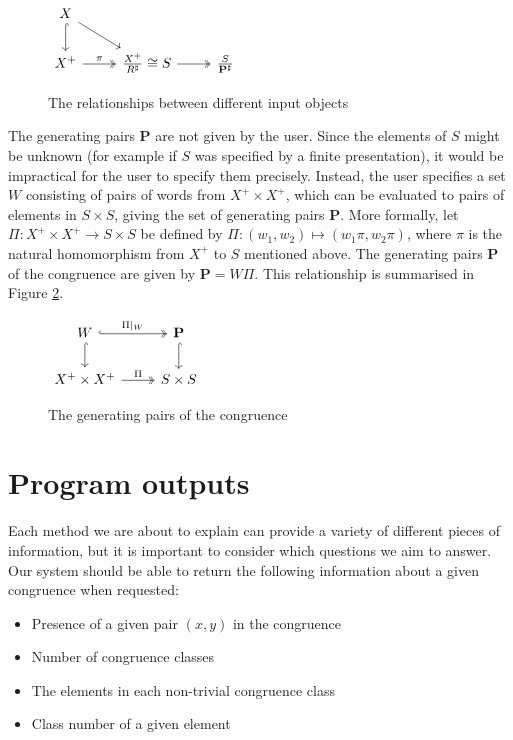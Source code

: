 \begin{figure}[h]
  \centering
  $\begin{tikzcd}
    X \arrow[dr] \arrow[d, hook] & \\
    X^+ \arrow[r, two heads, "\pi"] & \frac{X^+}{R^\sharp} \cong S \arrow[r, two heads] & \frac{S}{\mathbf{P}^\sharp}
  \end{tikzcd}$
  \caption{The relationships between different input objects}
  \label{fig:pairs-cd-1}
\end{figure}

The generating pairs $\mathbf{P}$ are not given by the user.  Since the elements
of $S$ might be unknown (for example if $S$ was specified by a finite
presentation), it would be impractical for the user to specify them precisely.
Instead, the user specifies a set $W$ consisting of pairs of words from
$X^+ \times X^+$, which can be evaluated to pairs of elements in $S \times S$,
giving the set of generating pairs $\mathbf{P}$.
More formally, let
$\Pi: X^+ \times X^+ \to S \times S$ be defined by
$\Pi: (w_1, w_2) \mapsto (w_1\pi, w_2\pi)$, where $\pi$ is the natural
homomorphism from $X^+$ to $S$ mentioned above.  The generating pairs
$\mathbf{P}$ of the congruence are given by $\mathbf{P} = W \Pi$.
This relationship is summarised in Figure \ref{fig:pairs-cd-2}.

\begin{figure}[h]
  \centering
  $\begin{tikzcd}
    W \arrow[r, hook, two heads, "\Pi|_W"] \arrow[d, hook] & \mathbf{P} \arrow[d, hook] \\
    X^+ \times X^+ \arrow[r, two heads, "\Pi"] & S \times S
  \end{tikzcd}$
  \caption{The generating pairs of the congruence}
  \label{fig:pairs-cd-2}
\end{figure}

\section{Program outputs}
\label{sec:program-outputs}

Each method we are about to explain can provide a variety of different pieces of
information, but it is important to consider which questions we aim to answer.
Our system should be able to return the following information about a given
congruence when requested:

\begin{itemize}
\item Presence of a given pair $(x,y)$ in the congruence
\item Number of congruence classes
\item The elements in each non-trivial congruence class
\item Class number of a given element
\end{itemize}

